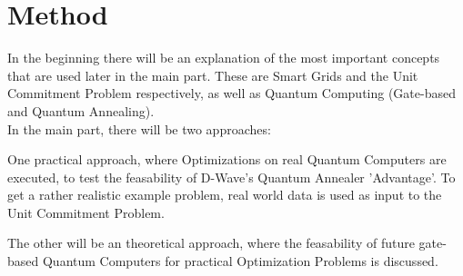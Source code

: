 \section{Method}

In the beginning there will be an explanation of the most important concepts
that are used later in the main part.
These are Smart Grids and the Unit Commitment Problem respectively,
as well as Quantum Computing (Gate-based and Quantum Annealing).\\

\noindent In the main part, there will be two approaches:

One practical approach, where Optimizations on real Quantum Computers are executed,
to test the feasability of D-Wave's Quantum Annealer 'Advantage'.
To get a rather realistic example problem, real world data is used as input to the Unit Commitment Problem.

The other will be an theoretical approach, where the feasability of future gate-based Quantum Computers
for practical Optimization Problems is discussed.
